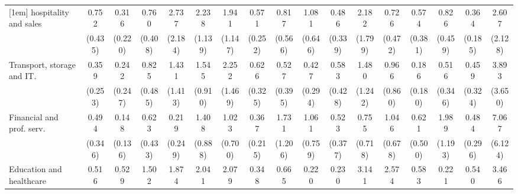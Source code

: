 {\begin{tabular}{l*{16}{c}}
[1em]
hospitality and sales&       0.752         &       0.316         &       0.760         &       2.737         &       2.238         &       1.941         &       0.571         &       0.817         &       1.081         &       0.486         &       2.182         &       0.726         &       0.574         &       0.826         &       0.364\sym{*}  &       2.607         \\
                    &     (0.435)         &     (0.220)         &     (0.408)         &     (2.184)         &     (1.139)         &     (1.147)         &     (0.252)         &     (0.566)         &     (0.646)         &     (0.339)         &     (1.799)         &     (0.472)         &     (0.381)         &     (0.459)         &     (0.185)         &     (2.128)         \\
[1em]
Transport, storage and IT.&       0.359         &       0.242         &       0.825         &       1.431         &       1.545         &       2.252         &       0.626         &       0.527         &       0.427         &       0.583         &       1.480         &       0.966         &       0.186         &       0.516         &       0.459         &       3.893         \\
                    &     (0.253)         &     (0.247)         &     (0.485)         &     (1.413)         &     (0.910)         &     (1.469)         &     (0.325)         &     (0.395)         &     (0.294)         &     (0.428)         &     (1.242)         &     (0.860)         &     (0.180)         &     (0.346)         &     (0.324)         &     (3.650)         \\
[1em]
Financial and prof. serv.&       0.494         &       0.148\sym{*}  &       0.623         &       0.219         &       1.408         &       1.023         &       0.367         &       1.731         &       1.061         &       0.523         &       0.755         &       1.046         &       0.621         &       1.989         &       0.484         &       7.067\sym{*}  \\
                    &     (0.346)         &     (0.136)         &     (0.433)         &     (0.249)         &     (0.888)         &     (0.700)         &     (0.215)         &     (1.206)         &     (0.759)         &     (0.377)         &     (0.718)         &     (0.678)         &     (0.500)         &     (1.193)         &     (0.296)         &     (6.124)         \\
[1em]
Education and healthcare&       0.516         &       0.529         &       1.502         &       1.874         &       2.041         &       2.079         &       0.348         &       0.665         &       0.220         &       0.230         &       3.141         &       2.574         &       0.583         &       0.221         &       0.540         &       3.466         \\

\end{tabular}}
